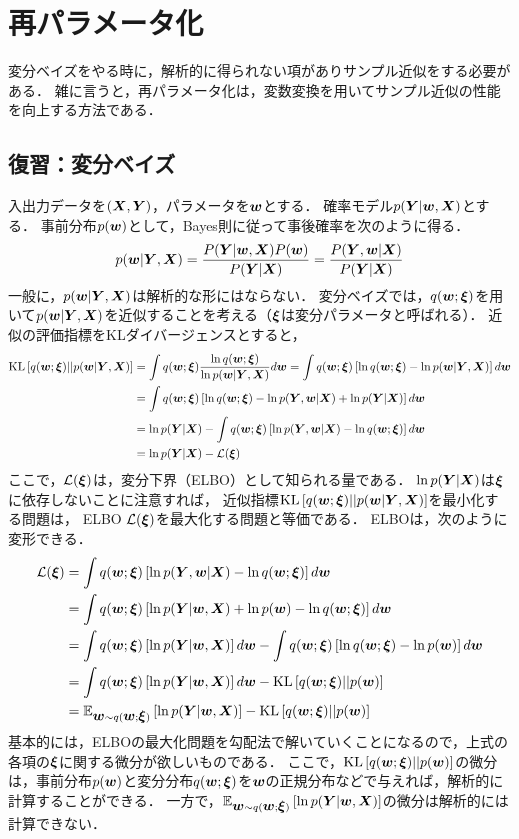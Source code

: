 \section{再パラメータ化}
\label{sec:reparameterization}
変分ベイズをやる時に，解析的に得られない項がありサンプル近似をする必要がある．
雑に言うと，再パラメータ化は，変数変換を用いてサンプル近似の性能を向上する方法である．


\subsection{復習：変分ベイズ}
入出力データを$(\vX,\vY)$，パラメータを$\vw$とする．
確率モデル$p(\vY|\vw,\vX)$とする．
事前分布$p(\vw)$として，Bayes則に従って事後確率を次のように得る．
\begin{align*}
p(\vw|\vY,\vX)
=
\frac{P(\vY|\vw,\vX)P(\vw)}{P(\vY|\vX)}
=
\frac{P(\vY,\vw|\vX)}{P(\vY|\vX)}
\end{align*}
一般に，$p(\vw|\vY,\vX)$は解析的な形にはならない．
変分ベイズでは，$q(\vw;\vxi)$を用いて$p(\vw|\vY,\vX)$を近似することを考える（$\vxi$は変分パラメータと呼ばれる）．
近似の評価指標をKLダイバージェンスとすると，
\begin{align*}
\mbox{KL}\left[
q(\vw;\vxi)||p(\vw|\vY,\vX)
\right]
&=
\int
q(\vw;\vxi)
\frac{\ln q(\vw;\vxi)}{\ln p(\vw|\vY,\vX)} d\vw
=
\int
q(\vw;\vxi)
\left[
\ln q(\vw;\vxi) - \ln p(\vw|\vY,\vX)
\right]
d\vw
\\
&=
\int
q(\vw;\vxi)
\left[
\ln q(\vw;\vxi) - \ln p(\vY,\vw|\vX) + \ln p(\vY|\vX)
\right]
d\vw
\\
&=
\ln p(\vY|\vX)
-
\int
q(\vw;\vxi)
\left[
\ln p(\vY,\vw|\vX) - \ln q(\vw;\vxi)
\right]
d\vw
\\
&=
\ln p(\vY|\vX)
-
{\mathcal{L}}(\vxi)
\end{align*}
ここで，${\mathcal{L}}(\vxi)$は，変分下界（ELBO）として知られる量である．
$\ln p(\vY|\vX)$は$\vxi$に依存しないことに注意すれば，
近似指標$\mbox{KL}\left[q(\vw;\vxi)||p(\vw|\vY,\vX)\right]$を最小化する問題は，
ELBO ${\mathcal{L}}(\vxi)$を最大化する問題と等価である．
ELBOは，次のように変形できる．
\begin{align*}
{\mathcal{L}}(\vxi)
&=
\int
q(\vw;\vxi)
\left[
\ln p(\vY,\vw|\vX) - \ln q(\vw;\vxi)
\right]
d\vw
\\
&=
\int
q(\vw;\vxi)
\left[
\ln p(\vY|\vw,\vX) + \ln p(\vw) - \ln q(\vw;\vxi)
\right]
d\vw
\\
&=
\int
q(\vw;\vxi)
\left[
\ln p(\vY|\vw,\vX)
\right]
d\vw
-
\int
q(\vw;\vxi)
\left[
\ln q(\vw;\vxi) -  \ln p(\vw)
\right]
d\vw
\\
&=
\int
q(\vw;\vxi)
\left[
\ln p(\vY|\vw,\vX)
\right]
d\vw
-
\mbox{KL}\left[
q(\vw;\vxi)||p(\vw)
\right]
\\
&=
\mathbb{E}_{\vw\sim q(\vw;\vxi)}
\left[
\ln p(\vY|\vw,\vX)
\right]
-
\mbox{KL}\left[
q(\vw;\vxi)||p(\vw)
\right]
\end{align*}
基本的には，ELBOの最大化問題を勾配法で解いていくことになるので，上式の各項の$\vxi$に関する微分が欲しいものである．
ここで，$\mbox{KL}\left[q(\vw;\vxi)||p(\vw)\right]$の微分は，事前分布$p(\vw)$と変分分布$q(\vw;\vxi)$を$\vw$の正規分布などで与えれば，解析的に計算することができる．
一方で，$\mathbb{E}_{\vw\sim q(\vw;\vxi)}\left[ \ln p(\vY|\vw,\vX)\right]$の微分は解析的には計算できない．

